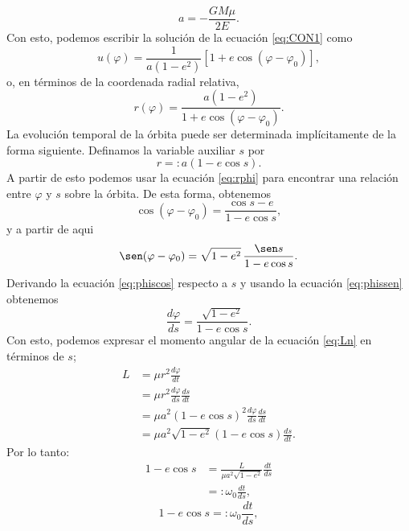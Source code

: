 \begin{equation}
    a= -\frac{GM\mu}{2E}. \label{eq:aE}
\end{equation}
Con esto, podemos escribir la solución de la ecuación \ref{eq:CON1} como 
\begin{equation}
    u(\varphi)=\frac{1}{a(1-e^2)}\left[1+e\cos
    (\varphi-\varphi_0)\right],
    \end{equation}
    o, en términos de la coordenada radial relativa,
    \begin{equation}\label{eq:rphi}
    r(\varphi)=\frac{a(1-e^2)}{1+e\cos(\varphi-\varphi_0)}.
\end{equation}
La evolución temporal de la órbita puede ser determinada implícitamente de la forma siguiente. Definamos la variable auxiliar
$s$ por
\begin{equation}\label{eq:rs}
    r=:a(1-e\cos s).
\end{equation}
A partir de esto podemos usar la ecuación \ref{eq:rphi} para encontrar una relación entre $\varphi$ y $s$ sobre la órbita.
De esta forma, obtenemos 
\begin{equation}\label{eq:phiscos}
    \cos(\varphi-\varphi_0)=\frac{\cos s -e}{1-e\cos s},
\end{equation}
y a partir de aqui
\begin{equation}\label{eq:phissen}
    \sen(\varphi-\varphi_0)=\sqrt{1-e^2}\,\frac{\sen s}{1-e\cos s}.
\end{equation}
Derivando la ecuación \ref{eq:phiscos} respecto a $s$ y usando la ecuación \ref{eq:phissen} obtenemos 
\begin{equation*}
    \frac{d\varphi}{ds}=\frac{\sqrt{1-e^2}}{1-e\cos s}.
\end{equation*}
Con esto, podemos expresar el momento angular de la ecuación \ref{eq:Ln} en términos de $s$;
\begin{align*}
    L & = \mu r^2 \frac{d\varphi}{dt} \\
    & = \mu r^2 \frac{d\varphi}{ds}\frac{ds}{dt} \\
    & = \mu a^2\left(1-e\cos s\right)^2 \frac{d\varphi}{ds}\frac{ds}{dt} \\
    & = \mu a^2\sqrt{1-e^2}\left(1-e\cos s\right) \frac{ds}{dt} .
\end{align*}
Por lo tanto:
\begin{align*}
    1-e\cos s & = \frac{L}{\mu a^2\sqrt{1-e^2}} \frac{dt}{ds} \\
    & =: \omega_0 \frac{dt}{ds},
\end{align*}
\begin{equation}
    1-e\cos s =: \omega_0 \frac{dt}{ds}, \label{eq:dtds}
\end{equation}
